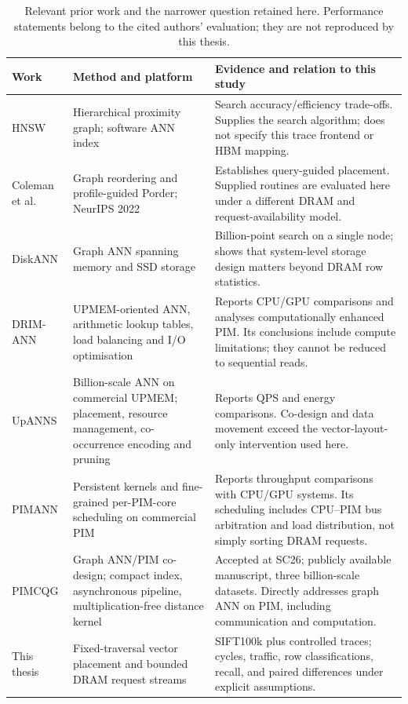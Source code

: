 \documentclass[11pt,a4paper]{report}
\begin{document}
\begin{table}[htbp]\centering\small
\caption[Position relative to prior work]{Relevant prior work and the narrower question retained here. Performance statements belong to the cited authors' evaluation; they are not reproduced by this thesis.}\label{tab:related}
\begin{tabular}{>{\raggedright\arraybackslash}p{}>{\raggedright\arraybackslash}p{}>{\raggedright\arraybackslash}p{}}
\toprule
Work & Method and platform & Evidence and relation to this study\\\midrule
HNSW \cite{hnsw} & Hierarchical proximity graph; software ANN index & Search accuracy/efficiency trade-offs. Supplies the search algorithm; does not specify this trace frontend or HBM mapping.\\
Coleman et al.\ \cite{coleman} & Graph reordering and profile-guided Porder; NeurIPS 2022 & Establishes query-guided placement. Supplied routines are evaluated here under a different DRAM and request-availability model.\\
DiskANN \cite{diskann} & Graph ANN spanning memory and SSD storage & Billion-point search on a single node; shows that system-level storage design matters beyond DRAM row statistics.\\
DRIM-ANN \cite{drim} & UPMEM-oriented ANN, arithmetic lookup tables, load balancing and I/O optimisation & Reports CPU/GPU comparisons and analyses computationally enhanced PIM. Its conclusions include compute limitations; they cannot be reduced to sequential reads.\\
UpANNS \cite{upanns} & Billion-scale ANN on commercial UPMEM; placement, resource management, co-occurrence encoding and pruning & Reports QPS and energy comparisons. Co-design and data movement exceed the vector-layout-only intervention used here.\\
PIMANN \cite{pimann} & Persistent kernels and fine-grained per-PIM-core scheduling on commercial PIM & Reports throughput comparisons with CPU/GPU systems. Its scheduling includes CPU--PIM bus arbitration and load distribution, not simply sorting DRAM requests.\\
PIMCQG \cite{pimcqg} & Graph ANN/PIM co-design; compact index, asynchronous pipeline, multiplication-free distance kernel & Accepted at SC26; publicly available manuscript, three billion-scale datasets. Directly addresses graph ANN on PIM, including communication and computation.\\
This thesis & Fixed-traversal vector placement and bounded DRAM request streams & SIFT100k plus controlled traces; cycles, traffic, row classifications, recall, and paired differences under explicit assumptions.\\\bottomrule
\end{tabular}
\end{table}
\end{document}
